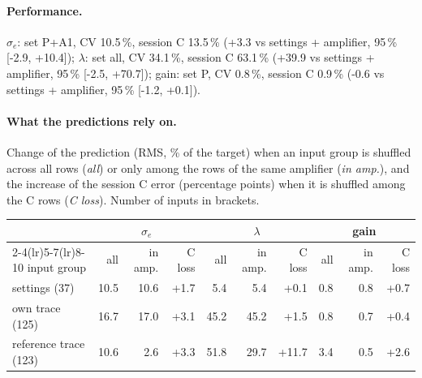 \paragraph{Performance.}
$\sigma_e$: set P+A1, CV 10.5\,\%, session C 13.5\,\% (+3.3 vs settings + amplifier, 95\,\% [-2.9, +10.4]); $\lambda$: set all, CV 34.1\,\%, session C 63.1\,\% (+39.9 vs settings + amplifier, 95\,\% [-2.5, +70.7]); gain: set P, CV 0.8\,\%, session C 0.9\,\% (-0.6 vs settings + amplifier, 95\,\% [-1.2, +0.1]).
\paragraph{What the predictions rely on.} Change of the prediction (RMS, \% of the target) when an input group is shuffled across all rows (\emph{all}) or only among the rows of the same amplifier (\emph{in amp.}), and the increase of the session C error (percentage points) when it is shuffled among the C rows (\emph{C loss}). Number of inputs in brackets.
\begin{center}\footnotesize
\begin{tabular}{lrrrrrrrrr}
\toprule
 & \multicolumn{3}{c}{$\sigma_e$} & \multicolumn{3}{c}{$\lambda$} & \multicolumn{3}{c}{gain} \\
\cmidrule(lr){2-4}\cmidrule(lr){5-7}\cmidrule(lr){8-10}
input group & all & in amp. & C loss & all & in amp. & C loss & all & in amp. & C loss \\
\midrule
settings (37) & 10.5 & 10.6 & +1.7 & 5.4 & 5.4 & +0.1 & 0.8 & 0.8 & +0.7 \\
own trace (125) & 16.7 & 17.0 & +3.1 & 45.2 & 45.2 & +1.5 & 0.8 & 0.7 & +0.4 \\
reference trace (123) & 10.6 & 2.6 & +3.3 & 51.8 & 29.7 & +11.7 & 3.4 & 0.5 & +2.6 \\
\bottomrule
\end{tabular}
\end{center}
